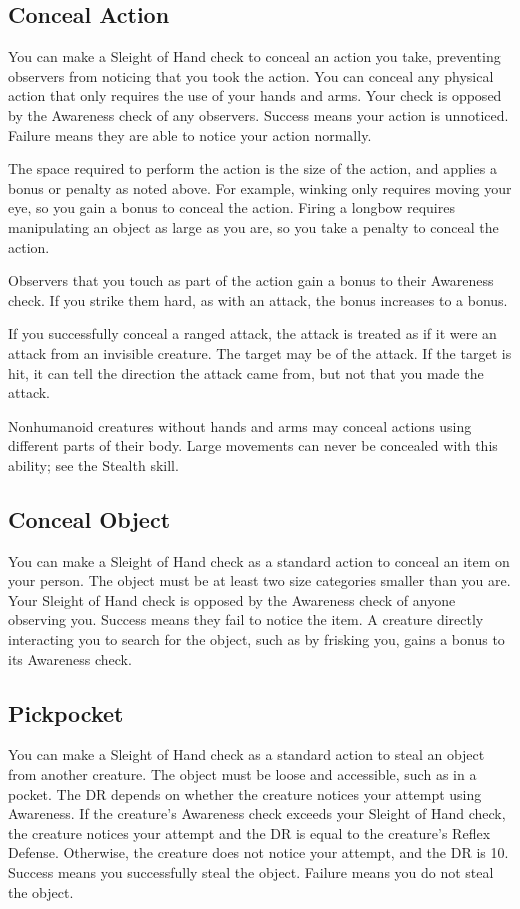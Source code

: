     \subsection{Conceal Action}
        You can make a Sleight of Hand check to conceal an action you take, preventing observers from noticing that you took the action. You can conceal any physical action that only requires the use of your hands and arms. Your check is opposed by the Awareness check of any observers. Success means your action is unnoticed. Failure means they are able to notice your action normally.

        The space required to perform the action is the size of the action, and applies a bonus or penalty as noted above. For example, winking only requires moving your eye, so you gain a  bonus to conceal the action. Firing a longbow requires manipulating an object as large as you are, so you take a  penalty to conceal the action.

        Observers that you touch as part of the action gain a  bonus to their Awareness check. If you strike them hard, as with an attack, the bonus increases to a  bonus.

        If you successfully conceal a ranged attack, the attack is treated as if it were an attack from an invisible creature. The target may be \unaware of the attack. If the target is hit, it can tell the direction the attack came from, but not that you made the attack.

        Nonhumanoid creatures without hands and arms may conceal actions using different parts of their body. Large movements can never be concealed with this ability; see the Stealth skill.

    \subsection{Conceal Object}
        You can make a Sleight of Hand check as a standard action to conceal an item on your person. The object must be at least two size categories smaller than you are. Your Sleight of Hand check is opposed by the Awareness check of anyone observing you. Success means they fail to notice the item. A creature directly interacting you to search for the object, such as by frisking you, gains a  bonus to its Awareness check.

    \subsection{Pickpocket}
        You can make a Sleight of Hand check as a standard action to steal an object from another creature. The object must be loose and accessible, such as in a pocket. The DR depends on whether the creature notices your attempt using Awareness. If the creature's Awareness check exceeds your Sleight of Hand check, the creature notices your attempt and the DR is equal to the creature's Reflex Defense. Otherwise, the creature does not notice your attempt, and the DR is 10. Success means you successfully steal the object. Failure means you do not steal the object.

